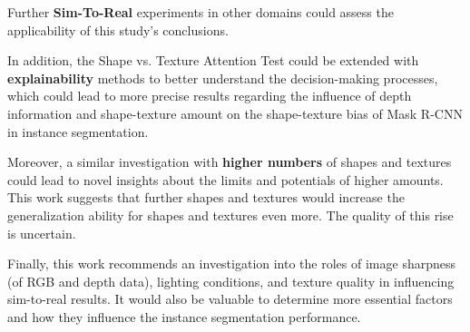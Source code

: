 		Further \textbf{Sim-To-Real} experiments in other domains could assess the applicability of this study's conclusions.
		
		In addition, the Shape vs. Texture Attention Test could be extended with \textbf{explainability} methods to better understand the decision-making processes, which could lead to more precise results regarding the influence of depth information and shape-texture amount on the shape-texture bias of Mask R-CNN in instance segmentation.
		
		Moreover, a similar investigation with \textbf{higher numbers} of shapes and textures could lead to novel insights about the limits and potentials of higher amounts. This work suggests that further shapes and textures would increase the generalization ability for shapes and textures even more. The quality of this rise is uncertain.
		
		Finally, this work recommends an investigation into the roles of image sharpness (of RGB and depth data), lighting conditions, and texture quality in influencing sim-to-real results. It would also be valuable to determine more essential factors and how they influence the instance segmentation performance.
	
		
	\clearpage
